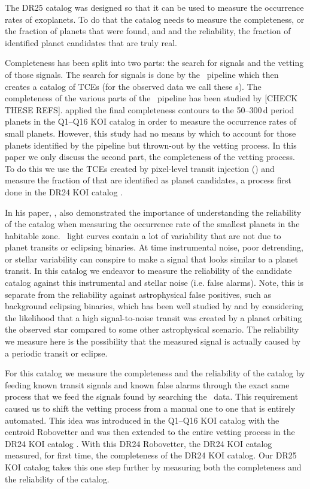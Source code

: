 The DR25 catalog was designed so that it can be used to measure the occurrence rates of exoplanets. To do that the catalog needs to measure the completeness, or the fraction of planets that were found, and and the reliability, the fraction of identified planet candidates that are truly real.  

Completeness has been split into two parts: the search for signals and the vetting of those signals. The search for signals is done by the \Kepler\ pipeline which then creates a catalog of TCEs (for the observed data we call these \opstce s).  The completeness of the various parts of the \Kepler\ pipeline has been studied by \citep{Christiansen2015b,Christiansen2013a}[CHECK THESE REFS]. \citet{Burke2015} applied the final completeness contours to the 50--300\,d period planets in the Q1--Q16 KOI catalog \citep{Mullally2015cat} in order to measure the occurrence rates of small planets. However, this study had no means by which to account for those planets identified by the pipeline but thrown-out by the vetting process.   In this paper we only discuss the second part, the completeness of the vetting process. To do this we use the TCEs created by pixel-level transit injection (\injtce) and measure the fraction of that are identified as planet candidates, a process first done in the DR24 KOI catalog \citet{Coughlin2016}.

In his paper, \citet{Burke2015}, also demonstrated the importance of understanding the reliability of the catalog when measuring the occurrence rate of the smallest planets in the habitable zone.  \Kepler\ light curves contain a lot of variability that are not due to planet transits or eclipsing binaries.  At time instrumental noise, poor detrending, or stellar variability can conspire to make a signal that looks similar to a planet transit. In this catalog we endeavor to measure the reliability of the candidate catalog against this instrumental and stellar noise (i.e. false alarms).  Note, this is separate from the reliability against astrophysical false positives, such as background eclipsing binaries, which has been well studied by \citep{Morton2016} and \citet{Torres2012} by considering the likelihood that a high signal-to-noise transit was created by a planet orbiting the observed star compared to some other astrophysical scenario.  The reliability we measure here is the possibility that the measured signal is actually caused by a periodic transit or eclipse.

For this catalog we measure the completeness and the reliability of the catalog by feeding known transit signals and known false alarms through the exact same process that we feed the signals found by searching the \Kepler\ data.  This requirement caused us to shift the vetting process from a manual one to one that is entirely automated.  This idea was introduced in the Q1--Q16 KOI catalog \citet{Mullally2016cat} with the centroid Robovetter and was then extended to the entire vetting process in the DR24 KOI catalog \citep{Coughlin2016}. With this DR24 Robovetter, the DR24 KOI catalog measured, for first time, the completeness of the DR24 KOI catalog. Our DR25 KOI catalog takes this one step further by measuring both the completeness and the reliability of the catalog.

